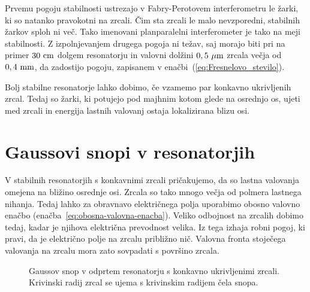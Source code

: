 Prvemu pogoju stabilnosti ustrezajo v Fabry-Perotovem interferometru
le žarki, ki so natanko pravokotni na zrcali. Čim sta zrcali le
malo nevzporedni, stabilnih žarkov sploh ni več. Tako imenovani planparalelni 
interferometer je tako na meji stabilnosti. Z izpolnjevanjem drugega
pogoja ni težav, saj morajo biti pri na primer $30~\centi\metre$ dolgem resonatorju in 
valovni dolžini $0,5~\mu\metre$ zrcala večja od $0,4~\milli\metre$, da zadostijo pogoju, 
zapisanem v enačbi~(\ref{eq:Fresnelovo_stevilo}).

Bolj stabilne resonatorje lahko dobimo, če vzamemo par konkavno ukrivljenih
zrcal. Tedaj so žarki, ki potujejo pod majhnim kotom glede na osrednjo os, ujeti
med zrcali in energija lastnih valovanj ostaja lokalizirana blizu
osi.

\section{Gaussovi snopi v resonatorjih}
V stabilnih resonatorjih s konkavnimi zrcali pričakujemo, da so
lastna valovanja omejena na bližino osrednje osi. Zrcala so tako mnogo 
večja od polmera lastnega nihanja. Tedaj lahko za obravnavo
električnega polja uporabimo obosno valovno enačbo (enačba~\ref{eq:obosna-valovna-enacba}). 
Veliko odbojnost na zrcalih dobimo tedaj, kadar je njihova električna prevodnost velika. 
Iz tega izhaja robni pogoj, ki pravi, da je električno polje na zrcalu 
približno nič. Valovna fronta stoječega valovanja na zrcalu mora zato 
sovpadati s površino zrcala.

\begin{figure}[h]
\centering
\def\svgwidth{100truemm} 

\caption{Gaussov snop v odprtem resonatorju s konkavno ukrivljenimi zrcali. 
Krivinski radij zrcal se ujema s krivinskim radijem čela snopa.}
\label{fig:Gaussov-snop-v-resonatorju}
\end{figure}

